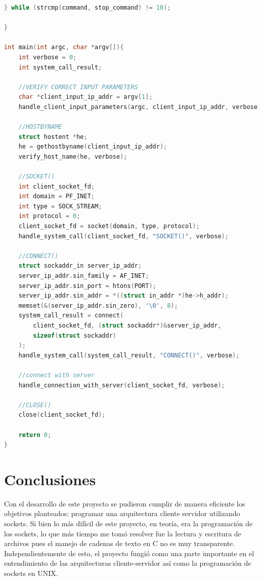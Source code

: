 \documentclass{article}
\begin{document}
\begin{lstlisting}[language=c]
    } while (strcmp(command, stop_command) != 10);

}

int main(int argc, char *argv[]){
    int verbose = 0;
    int system_call_result;

    //VERIFY CORRECT INPUT PARAMETERS    
    char *client_input_ip_addr = argv[1];
    handle_client_input_parameters(argc, client_input_ip_addr, verbose);

    //HOSTBYNAME
    struct hostent *he;
    he = gethostbyname(client_input_ip_addr);
    verify_host_name(he, verbose);

    //SOCKET()
    int client_socket_fd;
    int domain = PF_INET;
    int type = SOCK_STREAM;
    int protocol = 0;
    client_socket_fd = socket(domain, type, protocol);
    handle_system_call(client_socket_fd, "SOCKET()", verbose);

    //CONNECT()
    struct sockaddr_in server_ip_addr;
    server_ip_addr.sin_family = AF_INET;
    server_ip_addr.sin_port = htons(PORT);
    server_ip_addr.sin_addr = *((struct in_addr *)he->h_addr);
    memset(&(server_ip_addr.sin_zero), '\0', 8);
    system_call_result = connect(
        client_socket_fd, (struct sockaddr*)&server_ip_addr,
        sizeof(struct sockaddr)
    );
    handle_system_call(system_call_result, "CONNECT()", verbose);

    //connect with server
    handle_connection_with_server(client_socket_fd, verbose);

    //CLOSE()
    close(client_socket_fd);

    return 0;
}\end{lstlisting}



\section{Conclusiones}

Con el desarrollo de este proyecto se pudieron cumplir de manera eficiente los objetivos planteados: programar una arquitectura cliente servidor utilizando sockets. Si bien lo más difícil de este proyecto, en teoría, era la programación de los sockets, lo que más tiempo me tomó resolver fue la lectura y escritura de archivos pues el manejo de cadenas de texto en C no es muy transparente. Independientemente de esto, el proyecto fungió como una parte importante en el entendimiento de las arquitecturas cliente-servidor así como la programación de sockets en UNIX.
\end{document}

